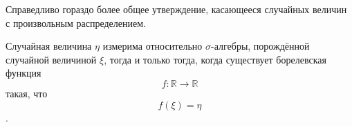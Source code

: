 Справедливо гораздо более общее утверждение, касающееся случайных величин с произвольным распределением.

\begin{theorem}
  Случайная величина $\eta$ измерима относительно $\sigma$-алгебры,
  порождённой случайной величиной $\xi$, тогда и только тогда,
  когда существует борелевская функция
  \begin{equation*}
    f: \mathbb{R} \rightarrow \mathbb{R}
  \end{equation*}
  такая, что
  \begin{equation*}
    f\left( \xi \right) = \eta
  \end{equation*}
  \cite[с.~219]{Shiryayev1}.
\end{theorem}
